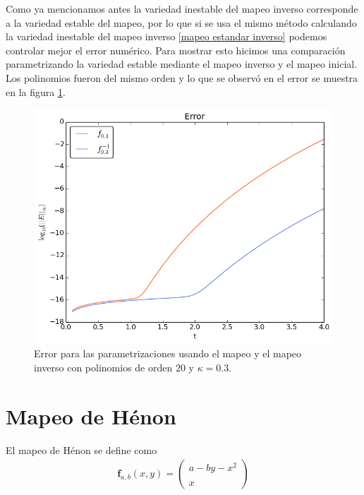 Como ya mencionamos antes la variedad inestable del mapeo inverso corresponde a la variedad estable del mapeo, por lo que si se usa el mismo método calculando la variedad inestable del mapeo inverso \ref{mapeo estandar inverso} podemos controlar mejor el error numérico. Para mostrar esto hicimos una comparación parametrizando la variedad estable mediante el mapeo inverso y el mapeo inicial. Los polinomios fueron del mismo orden y lo que se observó en el error se muestra en la figura \ref{erroresinverso}.


\begin{figure}[H]
\centering
\includegraphics[scale=0.6]{mapeoinver}
\caption{Error para las parametrizaciones usando el mapeo y el mapeo inverso con polinomios de orden $20$ y $\kappa=0.3$. }
\label{erroresinverso}
\end{figure}




\section{Mapeo de Hénon}
El mapeo de Hénon se define como \cite{devaney}
\begin{eqnarray}
\mathbf{f}_{a,b}(x,y)=\left( \begin{array}{lcc}
             a-by-x^{2}\\
             \\ x
             \end{array}
             \right) \label{Henon}
\end{eqnarray}

